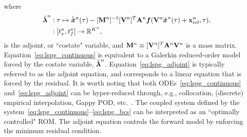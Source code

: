 where 
\begin{equation}\label{eq:costate_def}
\begin{split}
\hat{\boldsymbol \lambda}^{n} &: \tau \mapsto \dot{\hat{ \boldsymbol x}}^{n}(\tau)  -  [\mathbf{M}^{n}]^{-1} [\mathbf {V}^{n}]^T \mathbf{A}^{n}\boldsymbol f(\mathbf {V}^{n} \hat{ \boldsymbol x}^{n}(\tau) + \mathbf{x}_\text{ref}^{n} , \tau ) ,\\
&: [t_s^{n},t_f^{n}] \rightarrow \mathbb{R}^{K^{n}} ,
\end{split}
\end{equation}
is the adjoint, or ``costate" variable, and $\mathbf{M}^{n} \equiv [\mathbf {V}^{n}]^T \mathbf{A}^{n} \mathbf {V}^{n}$ is a mass matrix. 
Equation~\eqref{eq:lspg_continuous} is equivalent to a Galerkin reduced-order
model forced by the costate variable, $\hat{\boldsymbol \lambda}^{n}$.
Equation~\eqref{eq:lspg_adjoint} is typically referred to as the adjoint
equation, and corresponds to a linear equation that is forced by the residual.
It is worth noting that both ODEs~\eqref{eq:lspg_continuous}
and~\eqref{eq:lspg_adjoint} can be hyper-reduced through, e.g.,
collocation, (discrete) empirical interpolation, Gappy POD, etc.~\cite{everson_sirovich_gappy,eim,qdeim_drmac}. The
coupled system defined by the system~\eqref{eq:lspg_continuous}--\eqref{eq:lspg_bcs} can be interpreted as an ``optimally controlled"
ROM. The adjoint equation controls the forward model by enforcing the minimum
residual condition.

